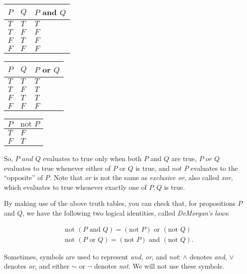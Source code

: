 \begin{table}[H]
    \centering
    \begin{tabular}{|l|l|l|}
    \hline
    $P$ & $Q$ & $P$ and $Q$ \\ \hline
    $T$ & $T$ & $T$        \\ \hline
    $T$ & $F$ & $F$        \\ \hline
    $F$ & $T$ & $F$        \\ \hline
    $F$ & $F$ & $F$        \\ \hline
    \end{tabular}
    \quad
    \begin{tabular}{|l|l|l|}
    \hline
    $P$ & $Q$ & $P$ or $Q$ \\ \hline
    $T$ & $T$ & $T$        \\ \hline
    $T$ & $F$ & $T$        \\ \hline
    $F$ & $T$ & $T$        \\ \hline
    $F$ & $F$ & $F$        \\ \hline
    \end{tabular}
    \quad
    \begin{tabular}{|l|l|}
    \hline
    $P$ & $\text{not } P$ \\ \hline
    $T$ & $F$      \\ \hline
    $F$ & $T$      \\ \hline
    \end{tabular}
\end{table}

So, $P \textit{ and } Q$ evaluates to true only when both $P$ and $Q$ are true, $P \textit{ or } Q$ evaluates to true whenever either of $P$ or $Q$ is true, and $\textit{not } P$ evaluates to the ``opposite'' of $P$. Note that \textit{or} is not the same as \textit{exclusive or}, also called \textit{xor}, which evaluates to true whenever exactly one of $P, Q$ is true.

By making use of the above truth tables, you can check that, for propositions $P$ and $Q$, we have the following two logical identities, called \textit{DeMorgan's laws}:

\begin{align*}
    &\text{not }(P \text{ and } Q) = (\text{not } P) \text{ or } (\text{not } Q) \\
    &\text{not }(P \text{ or } Q) = (\text{not } P) \text{ and } (\text{not } Q).
\end{align*}

Sometimes, symbols are used to represent \textit{and}, \textit{or}, and \textit{not}: $\wedge$ denotes \textit{and}, $\vee$ denotes \textit{or}, and either $\sim$ or $\neg$ denotes \textit{not}. We will not use these symbols.

